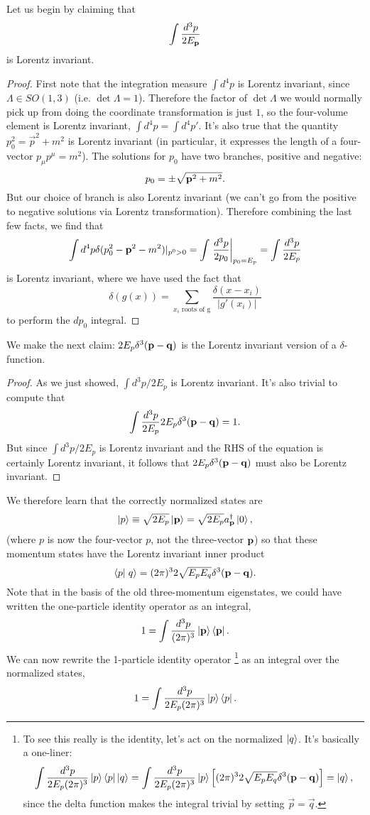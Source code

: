 Let us begin by claiming that
$$\int \frac{d^3p}{2E_{\boldsymbol{\mathbf{p}}}}$$ is Lorentz invariant. 
\begin{proof}
First note that the integration measure $\int d^4p$ is Lorentz invariant, since $\Lambda \in SO(1,3)$ (i.e. $\det \Lambda=1$). Therefore the factor of $\det \Lambda$ we would normally pick up from doing the coordinate transformation is just $1$, so the four-volume element is Lorentz invariant, $\int d^4p = \int d^4 p'$. It's also true that the quantity $p_0^2= \vec{p}^2+m^2$ is Lorentz invariant (in particular, it expresses the length of a four-vector $p_\mu p^\mu = m^2$). The solutions for $p_0$ have two branches, positive and negative:
$$p_0 = \pm \sqrt{\boldsymbol{\mathbf{p}}^2+m^2}.$$
But our choice of branch is also Lorentz invariant (we can't go from the positive to negative solutions via Lorentz transformation). Therefore combining the last few facts, we find that
$$\int d^4 p \delta(p_0^2-\boldsymbol{\mathbf{p}}^2-m^2)|_{p^0 >0} = \int \left.\frac{d^3 p}{2p_0}\right|_{p_0=E_p}=\int \frac{d^3p}{2E_p}$$
is Lorentz invariant, where we have used the fact that $$\delta(g(x))=\sum_{x_i\text{ roots of g}} \frac{\delta(x-x_i)}{|g'(x_i)|}$$
to perform the $dp_0$ integral.%
\end{proof}

We make the next claim: $2E_p \delta^3(\boldsymbol{\mathbf{p}} - \boldsymbol{\mathbf{q}})$ is the Lorentz invariant version of a $\delta$-function. \begin{proof}
As we just showed, $\int d^3p/2E_p$ is Lorentz invariant. It's also trivial to compute that
$$\int \frac{d^3 p}{2E_p} 2E_p \delta^3(\boldsymbol{\mathbf{p}} - \boldsymbol{\mathbf{q}})=1.$$
But since $\int d^3p/2E_p$ is Lorentz invariant and the RHS of the equation is certainly Lorentz invariant, it follows that $2E_p\delta^3(\boldsymbol{\mathbf{p}}-\boldsymbol{\mathbf{q}})$ must also be Lorentz invariant.
\end{proof}

We therefore learn that the correctly normalized states are
$$\left| p \right>\equiv \sqrt{2E_p}\left| \boldsymbol{\mathbf{p}} \right> = \sqrt{2 E_p}a_{\boldsymbol{\mathbf{p}}}^\dagger \left| 0 \right>,$$
(where $p$ is now the four-vector $p$, not the three-vector $\boldsymbol{\mathbf{p}}$) so that these momentum states have the Lorentz invariant inner product
$$\braket{p}{q}=(2\pi)^3 2\sqrt{E_p E_q} \delta^3(\pv - \vec q).$$
Note that in the basis of the old three-momentum eigenstates, we could have written the one-particle identity operator as an integral,
$$1=\int \frac{d^3p}{(2\pi)^3} \left| \boldsymbol{\mathbf{p}} \right>\left< \boldsymbol{\mathbf{p}} \right|.$$
We can now rewrite the 1-particle identity operator%
    \footnote{To see this really is the identity, let's act on the normalized $\left| q \right>$. It's basically a one-liner:
    $$\int \frac{d^3p}{2E_p(2\pi)^3}\left| p \right>\left< p \right|\left| q \right>=\int\frac{d^3p}{2E_p(2\pi)^3}\left| p \right>\left[(2\pi)^3 2\sqrt{E_pE_q}\delta^3(\boldsymbol{\mathbf{p}}-\boldsymbol{\mathbf{q}})\right]=\left| q \right>,$$ since the delta function makes the integral trivial by setting $\vec p = \vec q$.}
as an integral over the normalized states,
$$1=\int \frac{d^3p}{2E_p(2\pi)^3} \left| p \right>\left< p \right|.$$


